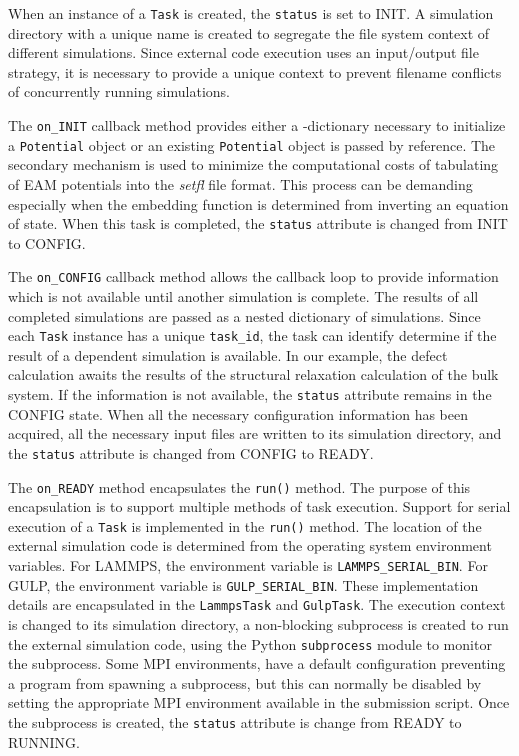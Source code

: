 When an instance of a \verb|Task| is created, the \verb|status| is set to INIT.  A simulation directory with a unique name is created to segregate the file system context of different simulations.  Since external code execution uses an input/output file strategy, it is necessary to provide a unique context to prevent filename conflicts of concurrently running simulations.

The \verb|on_INIT| callback method provides either a -dictionary necessary to initialize a \verb|Potential| object or an existing \verb|Potential| object is passed by reference.  The secondary mechanism is used to minimize the computational costs of tabulating of EAM potentials into the \emph{setfl} file format.  This process can be demanding especially when the embedding function is determined from inverting an equation of state.  When this task is completed, the \verb|status| attribute is changed from INIT to CONFIG.

The \verb|on_CONFIG| callback method allows the callback loop to provide information which is not available until another simulation is complete.  The results of all completed simulations are passed as a nested dictionary of simulations.  Since each \verb|Task| instance has a unique \verb|task_id|, the task can identify determine if the result of a dependent simulation is available.  In our example, the defect calculation awaits the results of the structural relaxation calculation of the bulk system.  If the information is not available, the \verb|status| attribute remains in the CONFIG state.  When all the necessary configuration information has been acquired, all the necessary input files are written to its simulation directory, and the \verb|status| attribute is changed from CONFIG to READY.

The \verb|on_READY| method encapsulates the \verb|run()| method.  The purpose of this encapsulation is to support multiple methods of task execution.  Support for serial execution of a \verb|Task| is implemented in the \verb|run()| method.  The  location of the external simulation code is determined from the operating system environment variables.  For LAMMPS, the environment variable is \verb|LAMMPS_SERIAL_BIN|.  For GULP, the environment variable is \verb|GULP_SERIAL_BIN|.  These implementation details are encapsulated in the \verb|LammpsTask| and \verb|GulpTask|.  The execution context is changed to its simulation directory, a non-blocking subprocess is created to run the external simulation code, using the Python \verb|subprocess| module to monitor the subprocess.  Some MPI environments, have a default configuration preventing a program from spawning a subprocess, but this can normally be disabled by setting the appropriate MPI environment available in the submission script.  Once the subprocess is created, the \verb|status| attribute is change from READY to RUNNING.

